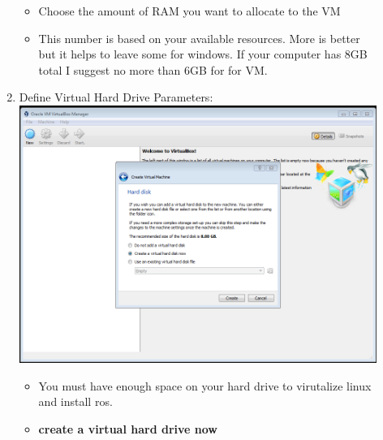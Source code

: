 \documentclass[12pt]{article}
\begin{document}
\begin{description}
\begin{enumerate}
\begin{itemize}
                \item Choose the amount of RAM you want to allocate to the VM
                \item This number is based on your available resources. More is better but it helps to leave some for windows. If your computer has 8GB total I suggest no more than 6GB for for VM.  
                
            \end{itemize}
	\newpage
\item Define Virtual Hard Drive Parameters: \vspace{20mm} \\
      		\includegraphics[scale=.6]{Capture4.png}\\
 \begin{itemize}
                
                \item You must have enough space on your hard drive to virutalize linux and install ros. 
                \item {\bf create a virtual hard drive now}
                

\end{itemize}
\end{enumerate}
\end{description}
\end{document}
